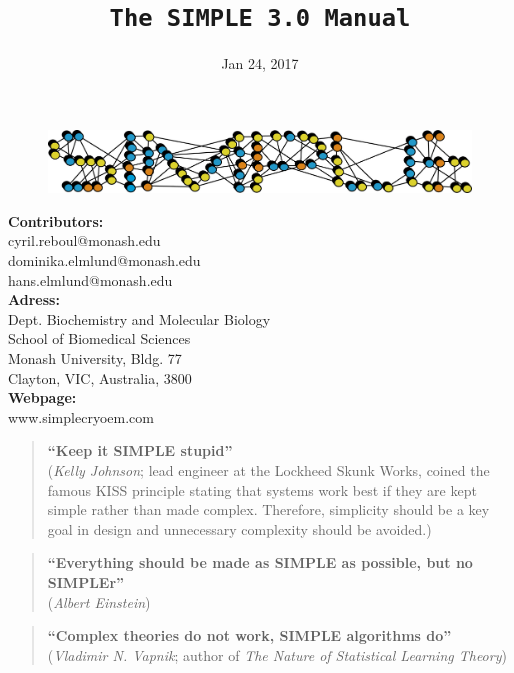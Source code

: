 \documentclass[a4paper,11pt]{article}
\newcommand{\prgname}[1]{\textcolor{NavyBlue}{\texttt{#1}}}
\begin{document}
\begin{figure}
\centering
\includegraphics[keepaspectratio=true,scale=0.6]{./SIMPLE_logo/rawlogo}
\end{figure}

\title{\prgname{The SIMPLE 3.0 Manual}}
\date{Jan 24, 2017}
\maketitle

\vspace{1em}
\begin{minipage}[ht]{0.48\textwidth}
\textbf{Contributors:}\\
cyril.reboul@monash.edu\\
dominika.elmlund@monash.edu\\
hans.elmlund@monash.edu\\
\textbf{Adress:}\\
Dept. Biochemistry and Molecular Biology\\
School of Biomedical Sciences\\
Monash University, Bldg. 77\\
Clayton, VIC, Australia, 3800\\
\textbf{Webpage:}\\
www.simplecryoem.com\\
\end{minipage}
\vspace{20pt}

\begin{quote}
\textbf{``Keep it SIMPLE stupid''}\\(\textit{Kelly Johnson}; lead engineer at the Lockheed Skunk Works, coined the famous KISS principle stating that systems work best if they are kept simple rather than made complex. Therefore, simplicity should be a key goal in design and unnecessary complexity should be avoided.)
\end{quote}

\begin{quote}
\textbf{``Everything should be made as SIMPLE as possible, but no SIMPLEr''}\\(\textit{Albert Einstein})
\end{quote}

\begin{quote}
\textbf{``Complex theories do not work, SIMPLE algorithms do''}\\(\textit{Vladimir N. Vapnik}; author of \textit{The Nature of Statistical Learning Theory})
\end{quote}
\clearpage
\end{document}
